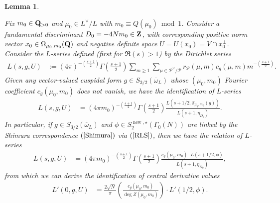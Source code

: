 \documentclass{amsart}
\newtheorem{lemma}[theorem]{Lemma}
\theoremstyle{definition}
\theoremstyle{definition}
\theoremstyle{definition}
\begin{document}
\begin{lemma}\label{7.3}  

Fix $m_0 \in {\bf{Q}}_{>0}$ and $\mu_0 \in L^{\vee}/L$ with $m_0 \equiv Q(\mu_0) \bmod 1$.
Consider a fundamental discriminant $D_0 = -4 N m_0 \in {\bf{Z}}$, with corresponding positive norm vector 
$x_0 \in \Omega_{\mu_0, m_0}({\bf{Q}})$ and negative definite space $U = U(x_0) = V \cap x_0^{\perp}$. 
Consider the $L$-series defined (first for $\Re(s) >1$) by the Dirichlet series
\begin{align*} L(s, g, U) &:= (4 \pi)^{- \left( \frac{s+1}{2} \right)} \Gamma \left( \frac{s+1}{2} \right) 
\sum\limits_{m \geq 1} \sum\limits_{\mu \in \mathcal{P}^{\vee}/\mathcal{P}}
r_{\mathcal{P}}(\mu, m) c_g(\mu, m) m^{- \left( \frac{s+1}{2} \right)}. \end{align*}
Given any vector-valued cuspidal form $g \in S_{3/2}(\overline{\omega}_L)$ whose $(\mu_0, m_0)$ 
Fourier coefficient $c_g(\mu_0, m_0)$ does not vanish, we have the identification of $L$-series
\begin{align*} L(s, g, U) &= (4 \pi m_0)^{- \left( \frac{s+1}{2} \right)} \Gamma \left( \frac{s+1}{2} \right) 
\frac{L(s +1/2, \mathcal{S}_{\mu_0, m_0}(g))}{ L(s+1, \eta_{D_0}) }.\end{align*}
In particular, if $g \in S_{3/2}(\overline{\omega}_L)$ and $\phi \in S_2^{\operatorname{new}, \star}(\Gamma_0(N))$ 
are linked by the Shimura correspondence $(\ref{Shimura})$ via $(\ref{RLS})$, then we have the relation of $L$-series
\begin{align*} L(s, g, U) &= (4 \pi m_0)^{- \left( \frac{s+1}{2} \right)} \Gamma \left( \frac{s+1}{2} \right) 
\frac{ c_g(\mu_0, m_0) \cdot L(s+1/2, \phi) }{ L(s+1, \eta_{D_0}) }, \end{align*}
from which we can derive the identification of central derivative values 
\begin{align*} L'(0, g, U) &= \frac{2 \sqrt{N}}{ \pi } \left( \frac{ c_g(\mu_0, m_0) }{\deg Z(\mu_0, m_0)} \right) \cdot L'(1/2, \phi).\end{align*} \end{lemma} 
\end{document}
